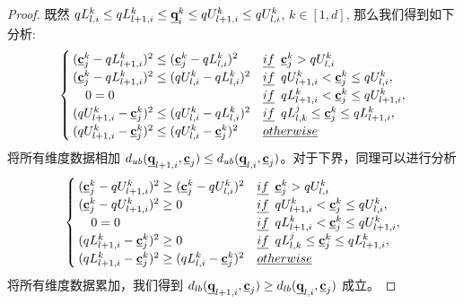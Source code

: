  \begin{proof}
 	既然 $qL_{l,i}^{k} \le qL_{l+1,i}^{k}  \le \emph{{\textbf{q}}}_{i}^{k} \le qU_{l+1,i}^{k} \le qU_{l,i}^{k}$,  
 	$k \in{[1,d]} $,  那么我们得到如下分析:
 	\begin{equation}	
 	\begin{cases}
 	(\emph{{\textbf{c}}}_{j}^{k} - qL_{l+1,i}^{k} )^{2} \le (\emph{{\textbf{c}}}_{j}^{k} - qL_{l,i}^{k})^{2} & \emph{if} \,\,\,   \emph{{\textbf{c}}}_{j}^{k} >qU_{l,i}^{k}\\ 
 	(\emph{{\textbf{c}}}_{j}^{k} - qL_{l+1,i}^{k} )^{2} \le   (qU_{l,i}^{k} - qL_{l,i}^{k})^{2}                  & \emph{if} \,\,\,   qU_{l+1,i}^{k} < \emph{{\textbf{c}}}_{j}^{k} \le qU_{l,i}^{k} ,\\ 
 	\quad 0 = 0                    & \emph{if} \,\,\,   qL_{l+1,i}^{k} < \emph{{\textbf{c}}}_{j}^{k} \le qU_{l+1,i}^{k} ,\\ 
 	(qU_{l+1,i}^{k}- \emph{{\textbf{c}}}_{j}^{k})^{2} \le (qU_{l,i}^{k}- qL_{l,i}^{k})^{2}                     &\emph{if} \,\,\,  qL_{l,k}^{j} \le \emph{{\textbf{c}}}_{j}^{k} \le qL_{l+1,i}^{k} ,\\ 
 	(qU_{l+1,i}^{k}- \emph{{\textbf{c}}}_{j}^{k})^{2} \le 	( qU_{l,i}^{k}- \emph{{\textbf{c}}}_{j}^{k})^{2}   & \emph{otherwise}
 	\end{cases}
 	\end{equation}
 	将所有维度数据相加 $d_{ub}(\emph{{\textbf{q}}}_{l+1,i}, \emph{{\textbf{c}}}_{j}) \le d_{ub}(\emph{{\textbf{q}}}_{l,i}, \emph{{\textbf{c}}}_{j})$。对于下界，同理可以进行分析
 	\begin{equation}	
 	\begin{cases}
 	(\emph{{\textbf{c}}}_{j}^{k} - qU_{l+1,i}^{k} )^{2} \ge (\emph{{\textbf{c}}}_{j}^{k} - qU_{l,i}^{k})^{2} & \emph{if} \,\,\,    \emph{{\textbf{c}}}_{j}^{k} >qU_{l,i}^{k}\\ 
 	(\emph{{\textbf{c}}}_{j}^{k} - qU_{l+1,i}^{k} )^{2} \ge 0  & \emph{if} \,\,\,   qU_{l+1,i}^{k} < \emph{{\textbf{c}}}_{j}^{k} \le qU_{l,i}^{k} ,\\ 
 	\quad	0 = 0                    & \emph{if} \,\,\,   qL_{l+1,i}^{k} < \emph{{\textbf{c}}}_{j}^{k} \le qU_{l+1,i}^{k} ,\\ 
 	( qL_{l+1,i}^{k}- \emph{{\textbf{c}}}_{j}^{k})^{2} \ge 0                    &\emph{if} \,\,\,   qL_{l,k}^{j} \le \emph{{\textbf{c}}}_{j}^{k} \le qL_{l+1,i}^{k} ,\\ 
 	( qL_{l+1,i}^{k}- \emph{{\textbf{c}}}_{j}^{k})^{2} \ge 	( qL_{l,i}^{k}- \emph{{\textbf{c}}}_{j}^{k})^{2}   & \emph{otherwise}
 	\end{cases}
 	\end{equation}
 	将所有维度数据累加，我们得到  $d_{lb}(\emph{{\textbf{q}}}_{l+1,i}, \emph{{\textbf{c}}}_{j}) \ge d_{lb}(\emph{{\textbf{q}}}_{l,i}, \emph{{\textbf{c}}}_{j})$ 成立。 
 \end{proof}

